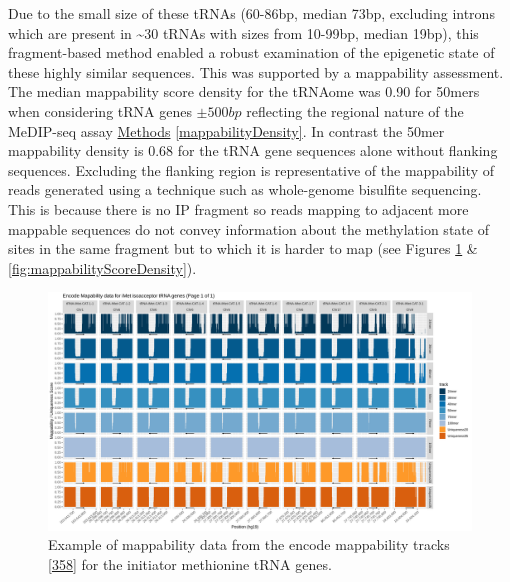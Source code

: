 \documentclass[
]{book}
\begin{document}
Due to the small size of these tRNAs (60-86bp, median 73bp, excluding introns which are present in \textasciitilde30 tRNAs with sizes from 10-99bp, median 19bp), this fragment-based method enabled a robust examination of the epigenetic state of these highly similar sequences.
This was supported by a mappability assessment.
The median mappability score density for the tRNAome was 0.90 for 50mers when considering tRNA genes \(\pm500bp\) reflecting the regional nature of the MeDIP-seq assay \protect\hyperlink{mappabilityDensity}{Methods} \ref{mappabilityDensity}.
In contrast the 50mer mappability density is 0.68 for the tRNA gene sequences alone without flanking sequences.
Excluding the flanking region is representative of the mappability of reads generated using a technique such as whole-genome bisulfite sequencing.
This is because there is no IP fragment so reads mapping to adjacent more mappable sequences do not convey information about the methylation state of sites in the same fragment but to which it is harder to map (see Figures \ref{fig:mappabilityiMet1} \& \ref{fig:mappabilityScoreDensity}).

\begin{figure}

{\centering \includegraphics[width=1\linewidth]{./figs/mappability-iMet1} 

}

\caption{Example of mappability data from the encode mappability tracks {[}\protect\hyperlink{ref-Derrien2012}{358}{]} for the initiator methionine tRNA genes.}\label{fig:mappabilityiMet1}
\end{figure}
\end{document}
